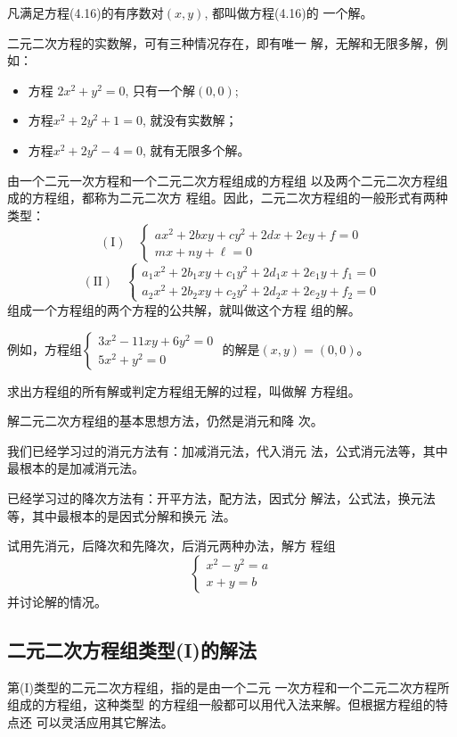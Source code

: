 凡满足方程(4.16)的有序数对$(x,y)$, 都叫做方程(4.16)的
一个解。

二元二次方程的实数解，可有三种情况存在，即有唯一
解，无解和无限多解，例如：
\begin{itemize}
    \item 方程 $2x^2+y^2=0$, 只有一个解$(0,0)$;
    \item 方程$x^2+2y^2+1=0$, 就没有实数解；
    \item 方程$x^2+2y^2-4=0$, 就有无限多个解。
\end{itemize}

由一个二元一次方程和一个二元二次方程组成的方程组
以及两个二元二次方程组成的方程组，都称为二元二次方
程组。因此，二元二次方程组的一般形式有两种类型：
\[(\text{I})\quad \begin{cases}
    ax^2+2bxy+cy^2+2dx+2ey+f=0\\
mx+ny+\ell=0
\end{cases}\]
\[(\text{II})\quad \begin{cases}
    a_1x^2+2b_1xy+c_1y^2+2d_1x+2e_1y+f_1=0\\
    a_2x^2+2b_2xy+c_2y^2+2d_2x+2e_2y+f_2=0
\end{cases}\]
组成一个方程组的两个方程的公共解，就叫做这个方程
组的解。

例如，方程组$\begin{cases}
 3x^2-11xy+6y^2=0\\
5x^2+y^2=0   
\end{cases}$
的解是$(x,y)=(0,0)$。
    
求出方程组的所有解或判定方程组无解的过程，叫做解
方程组。

解二元二次方程组的基本思想方法，仍然是消元和降
次。

我们已经学习过的消元方法有：加减消元法，代入消元
法，公式消元法等，其中最根本的是加减消元法。

已经学习过的降次方法有：开平方法，配方法，因式分
解法，公式法，换元法等，其中最根本的是因式分解和换元
法。

\begin{ex}
    试用先消元，后降次和先降次，后消元两种办法，解方
程组$$\begin{cases}
  x^2-y^2=a\\
x+y=b  
\end{cases}$$
并讨论解的情况。
\end{ex}

\subsection{二元二次方程组类型(I)的解法}
第(I)类型的二元二次方程组，指的是由一个二元
一次方程和一个二元二次方程所组成的方程组，这种类型
的方程组一般都可以用代入法来解。但根据方程组的特点还
可以灵活应用其它解法。


